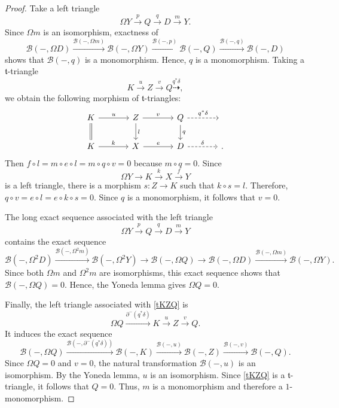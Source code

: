 \documentclass[a4paper,reqno,10pt]{amsart}
\theoremstyle{definition}
\theoremstyle{definition}
\theoremstyle{definition}
\theoremstyle{definition}
\theoremstyle{plain}
\newcommand{\ft}{\mathfrak{t}}
\newcommand{\CB}{\mathcal{B}}
\begin{document}
\begin{proof}
Take a left triangle
\[
\Omega Y\xrightarrow{p}Q\xrightarrow{q}D\xrightarrow{m}Y.
\]
Since $\Omega m$ is an isomorphism, exactness of
\[
\CB(-,\Omega D)
\xrightarrow{\CB(-,\Omega m)}
\CB(-,\Omega Y)
\xrightarrow{\CB(-,p)}
\CB(-,Q)
\xrightarrow{\CB(-,q)}
\CB(-,D)
\]
shows that $\CB(-,q)$ is a monomorphism. Hence, $q$ is a monomorphism.
Taking a $\ft$-triangle
\begin{equation}\label{tKZQ}
K\xrightarrow{u}Z\xrightarrow{v}Q\overset{q^{\ast}\delta}{\dashrightarrow},
\end{equation}
we obtain the following morphism of $\ft$-triangles:
\[
\begin{tikzcd}[column sep=large]
K
  \arrow[r,"u"]
  \arrow[d,equal]
&
Z
  \arrow[r,"v"]
  \arrow[d,"l"]
&
Q
  \arrow[r,dashed,"q^*\delta"]
  \arrow[d,"q"]
&
{}
\\
K
  \arrow[r,"k"]
&
X
  \arrow[r,"e"]
&
D
  \arrow[r,dashed,"\delta"]
&
{}.
\end{tikzcd}
\]
Then $f\circ l=m\circ e\circ l=m\circ q\circ v=0$ because $m\circ q=0$. Since
\[
\Omega Y\longrightarrow K\xrightarrow{k}X\xrightarrow{f}Y
\]
is a left triangle, there is a morphism $s\colon Z\to K$ such that $k\circ s=l$. Therefore, $q\circ v=e\circ l=e\circ k\circ s=0$. 
Since $q$ is a monomorphism, it follows that $v=0$.

The long exact sequence associated with the left triangle
\[
\Omega Y\xrightarrow{p}Q\xrightarrow{q}D\xrightarrow{m}Y
\]
contains the exact sequence
\[
\CB(-,\Omega^2D)
\xrightarrow{\CB(-,\Omega^2m)}
\CB(-,\Omega^2Y)
\longrightarrow
\CB(-,\Omega Q)
\longrightarrow
\CB(-,\Omega D)
\xrightarrow{\CB(-,\Omega m)}
\CB(-,\Omega Y).
\]
Since both $\Omega m$ and $\Omega^2m$ are isomorphisms, this exact sequence shows that $\CB(-,\Omega Q)=0$. Hence, the Yoneda lemma gives $\Omega Q=0$.

Finally, the left triangle associated with \eqref{tKZQ} %
is
\[
\Omega Q
\xrightarrow{\partial^-(q^*\delta)}
K\xrightarrow{u}Z\xrightarrow{v}Q.
\]
It induces the exact sequence
\[
\CB(-,\Omega Q)
\xrightarrow{\CB(-,\partial^-(q^*\delta))}
\CB(-,K)
\xrightarrow{\CB(-,u)}
\CB(-,Z)
\xrightarrow{\CB(-,v)}
\CB(-,Q).
\]
Since $\Omega Q=0$ and $v=0$, the natural transformation $\CB(-,u)$ is an isomorphism. By the Yoneda lemma, $u$ is an isomorphism. Since \eqref{tKZQ} 
is a $\ft$-triangle, it follows that $Q=0$. Thus, $m$ is a monomorphism and therefore a $1$-monomorphism.
\end{proof}
\end{document}
